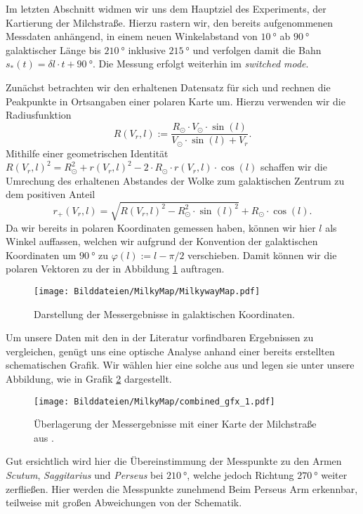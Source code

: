 \documentclass[../../main.tex]{subfiles}
\begin{document}
    Im letzten Abschnitt widmen wir uns dem Hauptziel des Experiments, der Kartierung der Milchstraße. Hierzu rastern wir, den bereits aufgenommenen Messdaten anhängend, in einem neuen Winkelabstand von $\SI{10}{\degree}$ ab $\SI{90}{\degree}$ galaktischer Länge bis $\SI{210}{\degree}$ inklusive $\SI{215}{\degree}$ und verfolgen damit die Bahn $s_*(t) = \delta l\cdot t + \SI{90}{\degree}$. Die Messung erfolgt weiterhin im \emph{switched mode}.
    
    Zunächst betrachten wir den erhaltenen Datensatz für sich und rechnen die Peakpunkte in Ortsangaben einer polaren Karte um. Hierzu verwenden wir die Radiusfunktion 
    \[
        R(V_r,l):= \frac{R_\odot\cdot V_\odot\cdot\sin(l)}{V_\odot\cdot\sin(l) + V_r}.
    \]
    Mithilfe einer geometrischen Identität $R(V_r,l)^2 = R_\odot^2 + r(V_r,l)^2 - 2\cdot R_\odot\cdot r(V_r,l)\cdot\cos(l)$ schaffen wir die Umrechung des erhaltenen Abstandes der Wolke zum galaktischen Zentrum zu dem positiven Anteil
    \[
        r_+(V_r,l) = \sqrt{R(V_r,l)^2 - R_\odot^2\cdot\sin(l)^2} + R_\odot\cdot\cos(l). 
    \]
    Da wir bereits in polaren Koordinaten gemessen haben, können wir hier $l$ als Winkel auffassen, welchen wir aufgrund der Konvention der galaktischen Koordinaten um $\SI{90}{\degree}$ zu $\varphi(l) := l - \pi/2$ verschieben. Damit können wir die polaren Vektoren zu der in Abbildung \ref{fig:GalaktischeMilchStrasse} auftragen.
    \begin{figure}[H]
        \centering
        \texttt{[image: Bilddateien/MilkyMap/MilkywayMap.pdf]}
        \caption{Darstellung der Messergebnisse in galaktischen Koordinaten.}
        \label{fig:GalaktischeMilchStrasse}
    \end{figure}
    Um unsere Daten mit den in der Literatur vorfindbaren Ergebnissen zu vergleichen, genügt uns eine optische Analyse anhand einer bereits erstellten schematischen Grafik. Wir wählen hier eine solche aus \cite{doi:10.1126/science.1120914} und legen sie unter unsere Abbildung, wie in Grafik \ref{fig:combinedMilkyWay} dargestellt.
    \begin{figure}[H]
        \centering
        \texttt{[image: Bilddateien/MilkyMap/combined\_gfx\_1.pdf]}
        \caption{Überlagerung der Messergebnisse mit einer Karte der Milchstraße aus \cite{doi:10.1126/science.1120914}.}
        \label{fig:combinedMilkyWay}
    \end{figure}
    Gut ersichtlich wird hier die Übereinstimmung der Messpunkte zu den Armen \emph{Scutum}, \emph{Saggitarius} und \emph{Perseus} bei $\SI{210}{\degree}$, welche jedoch Richtung $\SI{270}{\degree}$ weiter zerfließen. Hier werden die Messpunkte zunehmend Beim Perseus Arm erkennbar, teilweise mit großen Abweichungen von der Schematik. 
    
\end{document}
